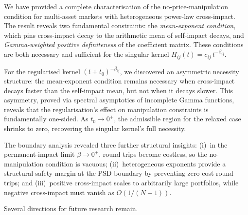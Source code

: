 \documentclass[12pt]{article}
\theoremstyle{definition}
\theoremstyle{remark}
\begin{document}
We have provided a complete characterisation of the no-price-manipulation condition for
multi-asset markets with heterogeneous power-law cross-impact.  The result reveals two
fundamental constraints: the \emph{mean-exponent condition}, which pins cross-impact decay
to the arithmetic mean of self-impact decays, and \emph{Gamma-weighted positive definiteness}
of the coefficient matrix.  These conditions are both necessary and sufficient for the
singular kernel $H_{ij}(t)=c_{ij}\,t^{-\beta_{ij}}$.

For the regularised kernel $(t+t_0)^{-\beta_{ij}}$, we discovered an asymmetric necessity
structure: the mean-exponent condition remains necessary when cross-impact decays faster
than the self-impact mean, but not when it decays slower.  This asymmetry, proved via
spectral asymptotics of incomplete Gamma functions, reveals that the regularisation's
effect on manipulation constraints is fundamentally one-sided.  As $t_0\to 0^+$,
the admissible region for the relaxed case shrinks to zero, recovering the singular
kernel's full necessity.

The boundary analysis revealed three further structural insights: (i)~in the permanent-impact
limit $\beta\to 0^+$, round trips become costless, so the no-manipulation condition is vacuous; (ii)~heterogeneous exponents provide a structural
safety margin at the PSD boundary by preventing zero-cost round trips; and (iii)~positive
cross-impact scales to arbitrarily large portfolios, while negative cross-impact must
vanish as $O(1/(N-1))$.

Several directions for future research remain.
\end{document}
